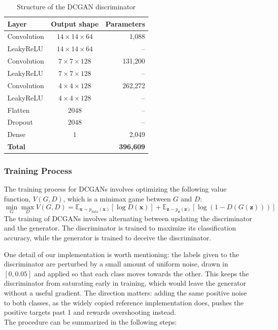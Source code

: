 \begin{table}[H]
    \centering
    \begin{tabular}{l c r}
    \textbf{Layer} & \textbf{Output shape} & \textbf{Parameters} \\
    \hline
    Convolution & \( 14 \times 14 \times 64 \) & 1{,}088 \\
    LeakyReLU & \( 14 \times 14 \times 64 \) & -- \\
    Convolution & \( 7 \times 7 \times 128 \) & 131{,}200 \\
    LeakyReLU & \( 7 \times 7 \times 128 \) & -- \\
    Convolution & \( 4 \times 4 \times 128 \) & 262{,}272 \\
    LeakyReLU & \( 4 \times 4 \times 128 \) & -- \\
    Flatten & \( 2048 \) & -- \\
    Dropout & \( 2048 \) & -- \\
    Dense & \( 1 \) & 2{,}049 \\
    \hline
    \textbf{Total} & & \textbf{396{,}609} \\
    \end{tabular}
    \caption{Structure of the DCGAN discriminator}
    \label{tab:dcgan discriminator}
\end{table}

\subsubsection{Training Process}

The training process for DCGANs involves optimizing the following value function, \( V(G, D) \), which is a minimax game between \( G \) and \( D \):
\begin{equation}
\min_G \max_D V(G, D) = \mathbb{E}_{\mathbf{x} \sim p_\text{data}(\mathbf{x})} [\log D(\mathbf{x})] + \mathbb{E}_{\mathbf{z} \sim p_\mathbf{z}(\mathbf{z})} [\log (1 - D(G(\mathbf{z})))]
\end{equation}
The training of DCGANs involves alternating between updating the discriminator and the generator. The discriminator is trained to maximize its classification accuracy, while the generator is trained to deceive the discriminator. 

One detail of our implementation is worth mentioning: the labels given to the discriminator are perturbed by a small amount of uniform noise, drawn in \( [0, 0.05] \) and applied so that each class moves towards the other. This keeps the discriminator from saturating early in training, which would leave the generator without a useful gradient. The direction matters: adding the same positive noise to both classes, as the widely copied reference implementation does, pushes the positive targets past 1 and rewards overshooting instead.
\\
The procedure can be summarized in the following steps:

